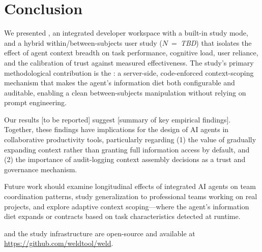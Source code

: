 \section{Conclusion}
\label{sec:conclusion}

We presented \Weld, an integrated developer workspace with a built-in study
mode, and a hybrid within/between-subjects user study ($N$~=~\emph{TBD}) that
isolates the effect of agent context breadth on task performance, cognitive
load, user reliance, and the calibration of trust against measured
effectiveness. The study's primary methodological
contribution is the \ContextGate: a server-side, code-enforced context-scoping
mechanism that makes the agent's information diet both configurable and
auditable, enabling a clean between-subjects manipulation without relying on
prompt engineering.


Our results [to be reported] suggest [summary of key empirical findings].
Together, these findings have implications for the design of AI agents in
collaborative productivity tools, particularly regarding (1) the value of
gradually expanding context rather than granting full information access by
default, and (2) the importance of audit-logging context assembly decisions as a
trust and governance mechanism.

Future work should examine longitudinal effects of integrated AI agents on team
coordination patterns, study generalization to professional teams working on
real projects, and explore adaptive context scoping---where the agent's
information diet expands or contracts based on task characteristics detected at
runtime.

\Weld and the study infrastructure are open-source and available at
\url{https://github.com/weldtool/weld}.
